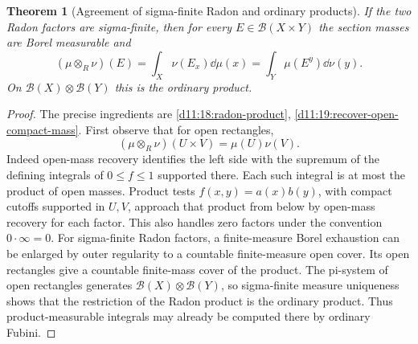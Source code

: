 \documentclass[11pt,oneside,openany]{book}
\newtheorem{theorem}{Theorem}[chapter]
\theoremstyle{definition}
\theoremstyle{remark}
\newcommand{\BB}{\mathcal B}\newcommand{\SSS}{\mathcal S}
\newcommand{\family}[1]{}
\begin{document}
\begin{theorem}[Agreement of sigma-finite Radon and ordinary products]\family{D11.18.sigmafinite_radon_product}\label{d11:18:sigmafinite-radon-product}
If the two Radon factors are sigma-finite, then for every $E\in\BB(X\times Y)$ the section masses are Borel measurable and
\[(\mu\otimes_R\nu)(E)=\int_X\nu(E_x)\dd\mu(x)=\int_Y\mu(E^y)\dd\nu(y).\]
On $\BB(X)\otimes\BB(Y)$ this is the ordinary product.
\end{theorem}
\begin{proof}
The precise ingredients are \cref{d11:18:radon-product}, \cref{d11:19:recover-open-compact-mass}. First observe that for open rectangles,
\[(\mu\otimes_R\nu)(U\times V)=\mu(U)\nu(V).
\]
Indeed open-mass recovery identifies the left side with the supremum of the defining integrals of $0\le f\le1$ supported there. Each such integral is at most the product of open masses. Product tests $f(x,y)=a(x)b(y)$, with compact cutoffs supported in $U,V$, approach that product from below by open-mass recovery for each factor. This also handles zero factors under the convention $0\cdot\infty=0$. For sigma-finite Radon factors, a finite-measure Borel exhaustion can be enlarged by outer regularity to a countable finite-measure open cover. Its open rectangles give a countable finite-mass cover of the product. The pi-system of open rectangles generates $\BB(X)\otimes\BB(Y)$, so sigma-finite measure uniqueness shows that the restriction of the Radon product is the ordinary product. Thus product-measurable integrals may already be computed there by ordinary Fubini.


\end{proof}
\end{document}
